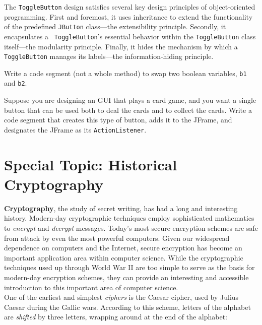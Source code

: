 The {\tt ToggleButton} design satisfies several key design
principles of object-oriented
programming.  First and foremost, it uses inheritance to extend the
functionality of the predefined {\tt JButton} class---the
extensibility principle. Secondly, it encapsulates a {\tt
ToggleButton}'s essential behavior within the {\tt ToggleButton} class
itself---the modularity principle. Finally, it hides the mechanism by
which a {\tt ToggleButton} manages its labels---the information-hiding
principle.




\label{self-study-exercises}
\begin{SSTUDY}

\item  Write a code segment (not a whole method) to swap
two boolean variables, {\tt b1} and {\tt b2}.

\item  Suppose you are designing an GUI that plays a
card game, and you want a single button that can
be used both to deal the cards and to collect the cards.
Write a code segment that creates this type of button,
adds it to the JFrame, and designates the JFrame as its
{\tt ActionListener}.

\end{SSTUDY}

\pagebreak
\section*{{\color{cyan}Special Topic:} Historical Cryptography}

{\bf Cryptography}, the study of secret writing,
has had a long and interesting history.   Modern-day cryptographic
techniques employ sophisticated mathematics to
{\it encrypt} and {\it decrypt} messages.  Today's most
\mbox{secure} encryption schemes are safe from attack by even the most
powerful computers.   Given our widespread dependence on computers and
the Internet, secure encryption has become an important application
area within computer science.  While the cryptographic techniques used up
through World War II are too simple to serve as the basis for modern-day encryption 
schemes, they can provide an interesting and accessible
introduction to this important area of computer science.\\
\hspace*{1pc}One of the earliest and simplest {\it ciphers} is the
Caesar cipher, used by Julius Caesar during the
Gallic wars.  According to this scheme, letters of the alphabet are
{\it shifted} by three letters, wrapping around at the end of the
alphabet:

